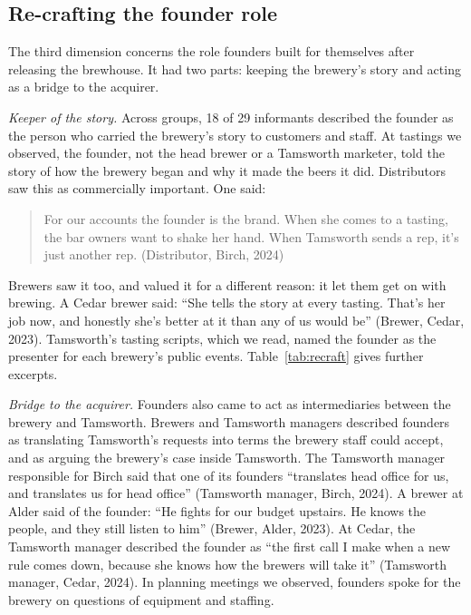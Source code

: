 \documentclass[12pt]{article}
\begin{document}
\subsection{Re-crafting the founder role}

The third dimension concerns the role founders built for themselves after releasing the brewhouse. It had two parts: keeping the brewery's story and acting as a bridge to the acquirer.

\textit{Keeper of the story.} Across groups, 18 of 29 informants described the founder as the person who carried the brewery's story to customers and staff. At tastings we observed, the founder, not the head brewer or a Tamsworth marketer, told the story of how the brewery began and why it made the beers it did. Distributors saw this as commercially important. One said:

\begin{quote}
For our accounts the founder is the brand. When she comes to a tasting, the bar owners want to shake her hand. When Tamsworth sends a rep, it's just another rep. (Distributor, Birch, 2024)
\end{quote}

\noindent Brewers saw it too, and valued it for a different reason: it let them get on with brewing. A Cedar brewer said: ``She tells the story at every tasting. That's her job now, and honestly she's better at it than any of us would be'' (Brewer, Cedar, 2023). Tamsworth's tasting scripts, which we read, named the founder as the presenter for each brewery's public events. Table~\ref{tab:recraft} gives further excerpts.

\textit{Bridge to the acquirer.} Founders also came to act as intermediaries between the brewery and Tamsworth. Brewers and Tamsworth managers described founders as translating Tamsworth's requests into terms the brewery staff could accept, and as arguing the brewery's case inside Tamsworth. The Tamsworth manager responsible for Birch said that one of its founders ``translates head office for us, and translates us for head office'' (Tamsworth manager, Birch, 2024). A brewer at Alder said of the founder: ``He fights for our budget upstairs. He knows the people, and they still listen to him'' (Brewer, Alder, 2023). At Cedar, the Tamsworth manager described the founder as ``the first call I make when a new rule comes down, because she knows how the brewers will take it'' (Tamsworth manager, Cedar, 2024). In planning meetings we observed, founders spoke for the brewery on questions of equipment and staffing.
\end{document}
